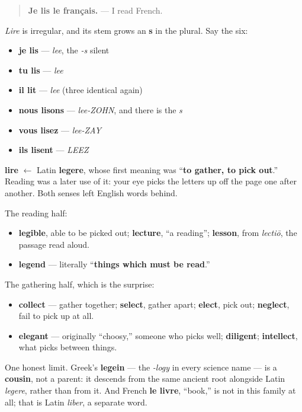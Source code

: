 \begin{quote}
\textbf{Je lis le français.} — I read French.
\end{quote}

\emph{Lire} is irregular, and its stem grows an \textbf{s} in the plural. Say the six:

\begin{itemize}
\raggedright
  \item \textbf{je lis} — \emph{lee}, the \emph{-s} silent
  \item \textbf{tu lis} — \emph{lee}
  \item \textbf{il lit} — \emph{lee} (three identical again)
  \item \textbf{nous lisons} — \emph{lee-ZOHN}, and there is the \emph{s}
  \item \textbf{vous lisez} — \emph{lee-ZAY}
  \item \textbf{ils lisent} — \emph{LEEZ}
\end{itemize}

\begin{cousinweb}
\textbf{lire} $\leftarrow$ Latin \textbf{legere}, whose first meaning was \textquotedblleft{}\textbf{to gather, to pick out}.\textquotedblright{} Reading was a later use of it: your eye picks the letters up off the page one after another. Both senses left English words behind.

The reading half:

\begin{itemize}
\raggedright
  \item \textbf{legible}, able to be picked out; \textbf{lecture}, \textquotedblleft{}a reading\textquotedblright{}; \textbf{lesson}, from \emph{lectiō}, the passage read aloud.
  \item \textbf{legend} — literally \textquotedblleft{}\textbf{things which must be read}.\textquotedblright{}
\end{itemize}

The gathering half, which is the surprise:

\begin{itemize}
\raggedright
  \item \textbf{collect} — gather together; \textbf{select}, gather apart; \textbf{elect}, pick out; \textbf{neglect}, fail to pick up at all.
  \item \textbf{elegant} — originally \textquotedblleft{}choosy,\textquotedblright{} someone who picks well; \textbf{diligent}; \textbf{intellect}, what picks between things.
\end{itemize}

One honest limit. Greek's \textbf{legein} — the \emph{-logy} in every science name — is a \textbf{cousin}, not a parent: it descends from the same ancient root alongside Latin \emph{legere}, rather than from it. And French \textbf{le livre}, \textquotedblleft{}book,\textquotedblright{} is not in this family at all; that is Latin \emph{liber}, a separate word.
\end{cousinweb}

